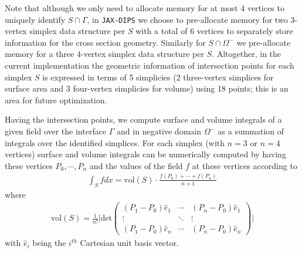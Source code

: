 \documentclass{elsarticle}
\begin{document}
Note that although we only need to allocate memory for at most 4 vertices to uniquely identify $S\cap\Gamma$, in \texttt{JAX-DIPS} we choose to pre-allocate memory for two 3-vertex simplex data structure per $S$ with a total of $6$ vertices to separately store information for the cross section geometry. Similarly for $S\cap \Omega^-$ we pre-allocate memory for a three 4-vertex simplex data structure per $S$. Altogether, in the current implementation the geometric information of intersection points for each simplex $S$ is expressed in terms of 5 simplicies (2 three-vertex simplices for surface area and 3 four-vertex simplicies for volume) using 18 points; this is an area for future optimization.




Having the intersection points, we compute surface and volume integrals of a given field over the interface $\Gamma$ and in negative domain $\Omega^-$ as a summation of integrals over the identified simplices. For each simplex (with $n=3$ or $n=4$ vertices) surface and volume integrals can be numerically computed by having these vertices ${P_0,\cdots, P_n}$ and the values of the field $f$ at these vertices according to 
\begin{align*}
\int_S f dx = \textrm{vol}(S)\cdot \frac{f(P_0) + \cdots + f(P_n)}{n+1}
\end{align*}
where
\begin{align*}
\textrm{vol}(S) = \frac{1}{n!} \bigg\vert \textrm{det} \begin{pmatrix}
(P_1-P_0)\hat{e}_1 & \cdots & (P_n-P_0)\hat{e}_1 \\
\vdots  & \ddots & \vdots  \\
(P_1-P_0)\hat{e}_n  & \cdots & (P_n-P_0)\hat{e}_n 
\end{pmatrix} \bigg\vert
\end{align*}
with $\hat{e}_i$ being the $i^{th}$ Cartesian unit basis vector.
\end{document}

